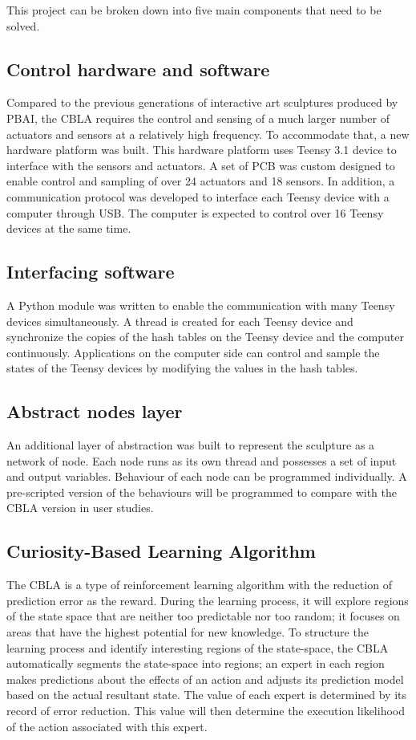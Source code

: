 This project can be broken down into five main components that need to be solved.

\subsection{Control hardware and software}

Compared to the previous generations of interactive art sculptures produced by PBAI, the CBLA requires the control and sensing of a much larger number of actuators and sensors at a relatively high frequency. To accommodate that, a new hardware platform was built. This hardware platform uses Teensy 3.1 device to interface with the sensors and actuators. A set of PCB was custom designed to enable control and sampling of over 24 actuators and 18 sensors. In addition, a communication protocol was developed to interface each Teensy device with a computer through USB. The computer is expected to control over 16 Teensy devices at the same time.

\subsection{Interfacing software}

A Python module was written to enable the communication with many Teensy devices simultaneously. A thread is created for each Teensy device and synchronize the copies of the hash tables on the Teensy device and the computer continuously. Applications on the computer side can control and sample the states of the Teensy devices by modifying the values in the hash tables.

\subsection{Abstract nodes layer}

An additional layer of abstraction was built to represent the sculpture as a network of node. Each node runs as its own thread and possesses a set of input and output variables. Behaviour of each node can be programmed individually. A pre-scripted version of the behaviours will be programmed to compare with the CBLA version in user studies.

\subsection{Curiosity-Based Learning Algorithm}

The CBLA is a type of reinforcement learning algorithm with the reduction of prediction error as the reward. During the learning process, it will explore regions of the state space that are neither too predictable nor too random; it focuses on areas that have the highest potential for new knowledge. To structure the learning process and identify interesting regions of the state-space, the CBLA automatically segments the state-space into regions; an expert in each region makes predictions about the effects of an action and adjusts its prediction model based on the actual resultant state. The value of each expert is determined by its record of error reduction. This value will then determine the execution likelihood of the action associated with this expert.

